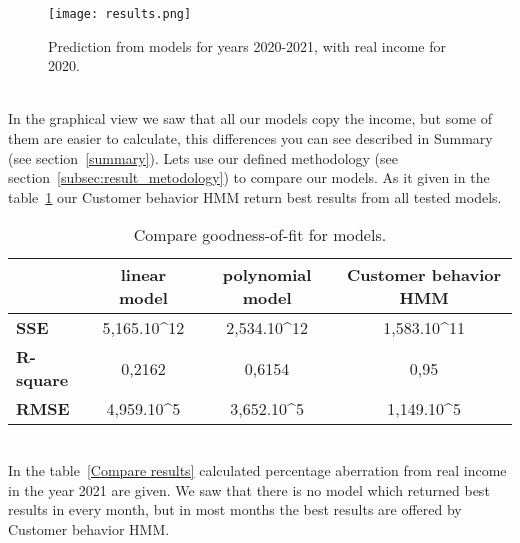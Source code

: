 \begin{figure}[h!]
    \begin{center}
        \texttt{[image: results.png]}
    \end{center}
    \caption{Prediction from models for years 2020-2021, with real income for 2020.}
    \label{results}
\end{figure}\\
In the graphical view we saw that all our models copy the income, but some of them are easier to calculate, this differences you can see described in Summary (see section~\ref{summary}).
Lets use our defined methodology (see section~\ref{subsec:result_metodology}) to compare our models.
As it given in the table~\ref{compare} our Customer behavior HMM return best results from all tested models.
\begin{table}[h!]
    \begin{center}
        \begin{tabular}{ | l | c | c | c |}
            \hline
            & \textbf{linear model} & \textbf{polynomial model} & \textbf{Customer behavior HMM}\\
            \hline
            \textbf{SSE} & 5,165.10^{12} & 2,534.10^{12} & 1,583.10^{11} \\
            \textbf{R-square} & 0,2162 & 0,6154 & 0,95 \\
            \textbf{RMSE} & 4,959.10^5 & 3,652.10^5 & 1,149.10^5\\
            \hline
        \end{tabular}
    \end{center}
    \caption{Compare goodness-of-fit for models.}
    \label{compare}
\end{table}\\
In the table~\ref{Compare results} calculated percentage aberration from real income in the year 2021 are given.
We saw that there is no model which returned best results in every month, but in most months the best results are offered by Customer behavior HMM.
